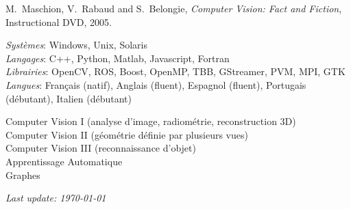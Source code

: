 \begin{llist}
M.~Maschion, V.~Rabaud and S.~Belongie, {\em Computer Vision: Fact and Fiction},
Instructional DVD, 2005.

{\em Syst\`{e}mes}: Windows, Unix, Solaris\\
{\em Langages}: C++, Python, Matlab, Javascript, Fortran \\
{\em Librairies}: OpenCV, ROS, Boost, OpenMP, TBB, GStreamer, PVM, MPI, GTK \\
{\em Langues}: Fran\c{c}ais (natif), Anglais (fluent), Espagnol (fluent), Portugais (d\'{e}butant), Italien 
(d\'{e}butant)

Computer Vision I (analyse d'image, radiom\'{e}trie, reconstruction 3D)\\
Computer Vision II (g\'{e}om\'{e}trie d\'{e}finie par plusieurs vues)\\
Computer Vision III (reconnaissance d'objet)\\
Apprentissage Automatique\\
Graphes\\




\end{llist}

{\em Last update: \today}


